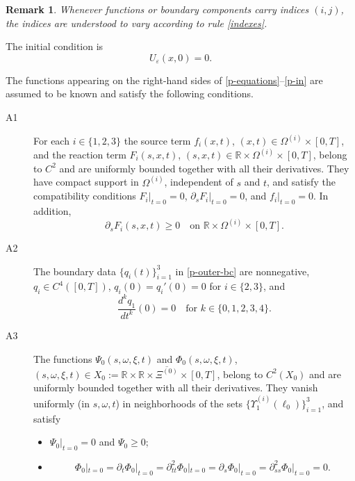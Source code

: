 \documentclass[reqno]{amsart}            %
\newtheorem{remark}{Remark}[section]
\numberwithin{equation}{section}
\begin{document}
	\begin{remark}\label{Rem-1-4}
		Whenever functions or boundary components carry indices $(i,j)$, the indices
		are understood to vary according to rule \eqref{indexes}.
	\end{remark}
	
	The initial condition is
	\begin{equation}\label{p-in}
		U_\varepsilon(x,0)=0.
	\end{equation}
	
	The functions appearing on the right-hand sides of
	\eqref{p-equations}–\eqref{p-in} are assumed to be known and satisfy the
	following conditions.
	\begin{description}
		\item[A1]
		For each $i\in\{1,2,3\}$ the source term $f_i(x,t)$,
		$(x,t)\in\Omega^{(i)}\times[0,T]$, and the reaction term
		$F_i(s,x,t)$, $(s,x,t)\in\mathbb{R}\times\Omega^{(i)}\times[0,T]$,
		belong to $C^2$ and are uniformly bounded together with all their derivatives.
		They have compact support in $\Omega^{(i)}$, independent of $s$ and $t$, and
		satisfy the compatibility conditions
		$F_i|_{t=0}=0$, $\partial_s F_i|_{t=0}=0$, and $f_i|_{t=0}=0$.
		In addition,
		\begin{equation}\label{pos-1}
			\partial_s F_i(s,x,t)\ge 0
			\quad\text{on }\mathbb{R}\times\Omega^{(i)}\times[0,T].
		\end{equation}
		
		\item[A2]
		The boundary data $\{q_i(t)\}_{i=1}^3$ in \eqref{p-outer-bc} are nonnegative,
		$q_i\in C^4([0,T])$, $q_i(0)=q_i'(0)=0$ for $i\in\{2,3\}$, and
		\begin{equation}\label{q_1}
			\frac{d^k q_1}{dt^k}(0)=0
			\quad\text{for } k\in\{0,1,2,3,4\}.
		\end{equation}
		
		\item[A3]
		The functions $\Psi_0(s,\omega,\xi,t)$ and $\Phi_0(s,\omega,\xi,t)$,
		$(s,\omega,\xi,t)\in X_0:=\mathbb{R}\times\mathbb{R}\times\overline{\Xi^{(0)}}\times[0,T]$,
		belong to $C^2(X_0)$ and are uniformly bounded together with all their derivatives.
		They vanish uniformly (in $s,\omega,t$) in neighborhoods of the sets
		$\{\Upsilon^{(i)}_1(\ell_0)\}_{i=1}^3$, and satisfy
		\begin{itemize}
			\item $\Psi_0|_{t=0}=0$ and $\Psi_0\ge 0$;
			\item
			\begin{equation}\label{com-con-Phi}
				\Phi_0|_{t=0}
				=\partial_t\Phi_0|_{t=0}
				=\partial_{tt}^2\Phi_0|_{t=0}
				=\partial_s\Phi_0|_{t=0}
				=\partial_{ss}^2\Phi_0|_{t=0}
				=0.
			\end{equation}
		\end{itemize}
		

\end{description}
\end{document}

